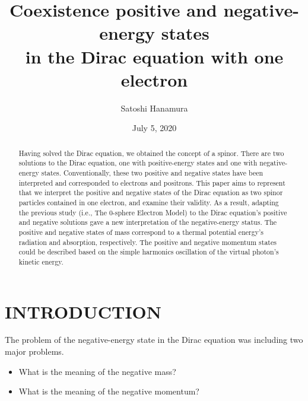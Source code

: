 \documentclass[%
 reprint,
 amsmath,amssymb,
 aps,
]{revtex4-1}
\numberwithin{equation}{section}%
\begin{document}


    \title{Coexistence positive and negative-energy states \\ in the Dirac equation with one electron}
    \author{Satoshi Hanamura}
    \date{July 5, 2020}
        \begin{abstract}

    Having solved the Dirac equation, we obtained the concept of a spinor. There are two solutions to the Dirac equation, one with positive-energy states and one with negative-energy states. Conventionally, these two positive and negative states have been interpreted and corresponded to electrons and positrons. This paper aims to represent that we interpret the positive and negative states of the Dirac equation as two spinor particles contained in one electron, and examine their validity. As a result, adapting the previous study (i.e., The 0-sphere Electron Model) to the Dirac equation's positive and negative solutions gave a new interpretation of the negative-energy status. The positive and negative states of mass correspond to a thermal potential energy's radiation and absorption, respectively. The positive and negative momentum states could be described based on the simple harmonics oscillation of the virtual photon's kinetic energy.



        \end{abstract}
    \maketitle



\section{\label{sec:INTRODUCTION}INTRODUCTION}




    The problem of the negative-energy state in the Dirac equation was including two major problems.
    
    \begin{itemize}
        \item What is the meaning of the negative mass?
        \item What is the meaning of the negative momentum?
    \end{itemize}
\end{document}
